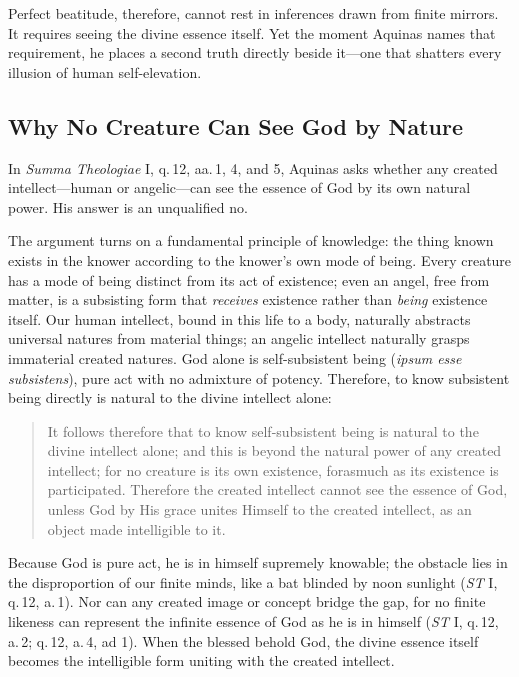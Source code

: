 Perfect beatitude, therefore, cannot rest in inferences drawn from finite mirrors. It requires seeing the divine essence itself. Yet the moment Aquinas names that requirement, he places a second truth directly beside it---one that shatters every illusion of human self-elevation.

\subsection*{Why No Creature Can See God by Nature}

In \emph{Summa Theologiae} I, q.\,12, aa.\,1, 4, and 5, Aquinas asks whether any created intellect---human or angelic---can see the essence of God by its own natural power. His answer is an unqualified no.

The argument turns on a fundamental principle of knowledge: the thing known exists in the knower according to the knower's own mode of being. Every creature has a mode of being distinct from its act of existence; even an angel, free from matter, is a subsisting form that \emph{receives} existence rather than \emph{being} existence itself. Our human intellect, bound in this life to a body, naturally abstracts universal natures from material things; an angelic intellect naturally grasps immaterial created natures. God alone is self-subsistent being (\emph{ipsum esse subsistens}), pure act with no admixture of potency. Therefore, to know subsistent being directly is natural to the divine intellect alone:

\begin{quote}
It follows therefore that to know self-subsistent being is natural to the divine intellect alone; and this is beyond the natural power of any created intellect; for no creature is its own existence, forasmuch as its existence is participated. Therefore the created intellect cannot see the essence of God, unless God by His grace unites Himself to the created intellect, as an object made intelligible to it.
\end{quote}

Because God is pure act, he is in himself supremely knowable; the obstacle lies in the disproportion of our finite minds, like a bat blinded by noon sunlight (\emph{ST} I, q.\,12, a.\,1). Nor can any created image or concept bridge the gap, for no finite likeness can represent the infinite essence of God as he is in himself (\emph{ST} I, q.\,12, a.\,2; q.\,12, a.\,4, ad 1). When the blessed behold God, the divine essence itself becomes the intelligible form uniting with the created intellect.

